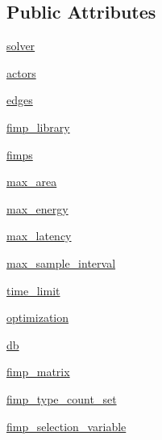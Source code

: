 \subsection*{Public Attributes}
\begin{DoxyCompactItemize}
\item 
\hyperlink{classsylva_1_1dse_1_1dse__engine__v1_1_1dse__v1_a2297e46c146e963ca8cce4f0c7416048}{solver}
\item 
\hyperlink{classsylva_1_1dse_1_1dse__engine__v1_1_1dse__v1_a9f0aaeefa528b0ae754ebce69fc2375a}{actors}
\item 
\hyperlink{classsylva_1_1dse_1_1dse__engine__v1_1_1dse__v1_a0b5b8b822b9f2c0857d863d5276d1414}{edges}
\item 
\hyperlink{classsylva_1_1dse_1_1dse__engine__v1_1_1dse__v1_ab451dd1ea77ef019a6413ab93f3ee766}{fimp\+\_\+library}
\item 
\hyperlink{classsylva_1_1dse_1_1dse__engine__v1_1_1dse__v1_a737ef1a913b4f4911e847240fd2c4bdc}{fimps}
\item 
\hyperlink{classsylva_1_1dse_1_1dse__engine__v1_1_1dse__v1_a7ccaf97aee0eea5ee5b815cc15c9ca8c}{max\+\_\+area}
\item 
\hyperlink{classsylva_1_1dse_1_1dse__engine__v1_1_1dse__v1_aeb393a5a395f63412042d4cbeb299148}{max\+\_\+energy}
\item 
\hyperlink{classsylva_1_1dse_1_1dse__engine__v1_1_1dse__v1_aff2dc8fd64544ea6cb34f13ea949db60}{max\+\_\+latency}
\item 
\hyperlink{classsylva_1_1dse_1_1dse__engine__v1_1_1dse__v1_a4ad1aafd9ec5d08061e190467de2d0ca}{max\+\_\+sample\+\_\+interval}
\item 
\hyperlink{classsylva_1_1dse_1_1dse__engine__v1_1_1dse__v1_a8c776f086963df1ce7224d67075ba86e}{time\+\_\+limit}
\item 
\hyperlink{classsylva_1_1dse_1_1dse__engine__v1_1_1dse__v1_a8ebe05aa84646bc616a571dcafe24981}{optimization}
\item 
\hyperlink{classsylva_1_1dse_1_1dse__engine__v1_1_1dse__v1_a101aec57bb8b85a9b4ecc57f590b93da}{db}
\item 
\hyperlink{classsylva_1_1dse_1_1dse__engine__v1_1_1dse__v1_abc4a055bb69cf4b3e361532896272c26}{fimp\+\_\+matrix}
\item 
\hyperlink{classsylva_1_1dse_1_1dse__engine__v1_1_1dse__v1_a9a0ec17de620253d23e8106cbffc03dd}{fimp\+\_\+type\+\_\+count\+\_\+set}
\item 
\hyperlink{classsylva_1_1dse_1_1dse__engine__v1_1_1dse__v1_a435966020492e15375a314b40ba66a59}{fimp\+\_\+selection\+\_\+variable}

\end{DoxyCompactItemize}
